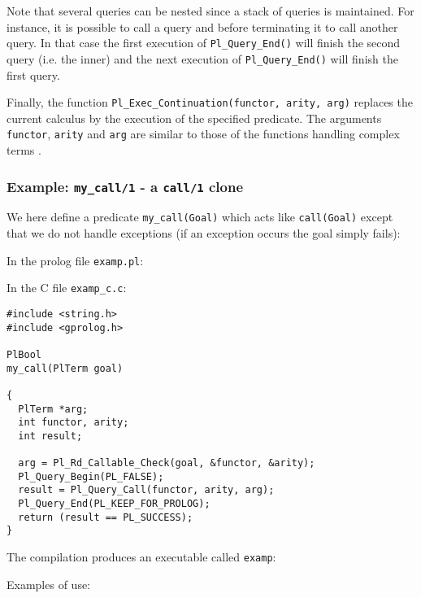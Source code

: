 Note that several queries can be nested since a stack of queries is
maintained. For instance, it is possible to call a query and before
terminating it to call another query. In that case the first execution of
\texttt{Pl\_Query\_End()} will finish the second query (i.e. the inner) and
the next execution of \texttt{Pl\_Query\_End()} will finish the first query.

Finally, the function \texttt{Pl\_Exec\_Continuation(functor, arity,
arg)} replaces the current calculus by the execution of the specified
predicate. The arguments \texttt{functor}, \texttt{arity} and
\texttt{arg} are similar to those of the functions handling complex
terms .

\subsubsection{Example: \texttt{my\_call/1} - a \texttt{call/1} clone}

We here define a predicate \texttt{my\_call(Goal)} which acts like
\texttt{call(Goal)} except that we do not handle exceptions (if an exception
occurs the goal simply fails):

In the prolog file \texttt{examp.pl}:


In the C file \texttt{examp\_c.c}:

\begin{Indentation}
\begin{verbatim}
#include <string.h>
#include <gprolog.h>

PlBool
my_call(PlTerm goal)

{
  PlTerm *arg;
  int functor, arity;
  int result;

  arg = Pl_Rd_Callable_Check(goal, &functor, &arity);
  Pl_Query_Begin(PL_FALSE);
  result = Pl_Query_Call(functor, arity, arg);
  Pl_Query_End(PL_KEEP_FOR_PROLOG);
  return (result == PL_SUCCESS);
}
\end{verbatim}
\end{Indentation}

The compilation produces an executable called \texttt{examp}:


Examples of use:

\begin{CodeTwoCols}
\SkipLine
{}
\SkipLine
{}
\SkipLine
{}
\SkipLine
{}
\SkipLine
{}
\SkipLine
{}
\SkipLine
{}
\end{CodeTwoCols}

